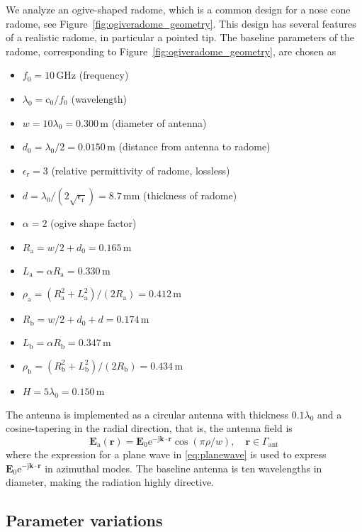 \documentclass[a4paper,12pt]{article}
\renewcommand{\vec}[1]{\boldsymbol{#1}}
\newcommand{\mrm}[1]{\mathrm{#1}}
\newcommand{\unit}[1]{\ensuremath{\,\mrm{#1}}}
\newcommand{\ju}{\mrm{j}}
\newcommand{\eu}{\mrm{e}}
\newcommand{\cu}{\mrm{c}_{0}}
\newcommand{\Ev}{\vec{E}}
\newcommand{\rv}{\vec{r}}
\newcommand{\kv}{\vec{k}}
\begin{document}
We analyze an ogive-shaped radome, which is a common design for a nose
cone radome, see Figure~\ref{fig:ogiveradome_geometry}. This design
has several features of a realistic radome, in particular a pointed
tip. The baseline parameters of the radome, corresponding to
Figure~\ref{fig:ogiveradome_geometry}, are chosen as
\begin{itemize}
\item $f_{0} = 10\unit{GHz}$ (frequency)
\item $\lambda_{0} = \cu/f_{0}$ (wavelength)
\item $w = 10\lambda_{0} = 0.300\unit{m}$ (diameter of antenna)
\item $d_{0} = \lambda_{0}/2 = 0.0150\unit{m}$ (distance from antenna to radome)
\item $\epsilon_{\mrm{r}} = 3$ (relative permittivity of radome, lossless)
\item $d = \lambda_{0}/(2\sqrt{\epsilon_{\mrm{r}}}) = 8.7\unit{mm}$
  (thickness of radome)
\item $\alpha = 2$ (ogive shape factor)
\item $R_{\mrm{a}} = w/2 + d_{0} = 0.165\unit{m}$
\item $L_{\mrm{a}} = \alpha R_{\mrm{a}} = 0.330\unit{m}$
\item $\rho_{\mrm{a}} = (R_{\mrm{a}}^{2} + L_{\mrm{a}}^{2})/(2R_{\mrm{a}}) = 0.412\unit{m}$
\item $R_{\mrm{b}} = w/2 + d_{0} + d = 0.174\unit{m}$
\item $L_{\mrm{b}} = \alpha R_{\mrm{b}} = 0.347\unit{m}$
\item $\rho_{\mrm{b}} = (R_{\mrm{b}}^{2} + L_{\mrm{b}}^{2})/(2R_{\mrm{b}}) = 0.434\unit{m}$
\item $H = 5\lambda_{0} = 0.150\unit{m}$
\end{itemize}
The antenna is implemented as a circular antenna with thickness
$0.1\lambda_{0}$ and a cosine-tapering in the radial direction, that
is, the antenna field is
\begin{equation}
  \Ev_{\mrm{a}}(\rv) = \Ev_{0}\eu^{-\ju\kv\cdot\rv}\cos(\pi\rho/w), \quad \rv\in\Gamma_{\mrm{ant}}
\end{equation}
where the expression for a plane wave in \eqref{eq:planewave} is used
to express $\Ev_{0}\eu^{-\ju\kv\cdot\rv}$ in azimuthal modes. The
baseline antenna is ten wavelengths in diameter, making the radiation
highly directive.


\subsection{Parameter variations}
\end{document}
